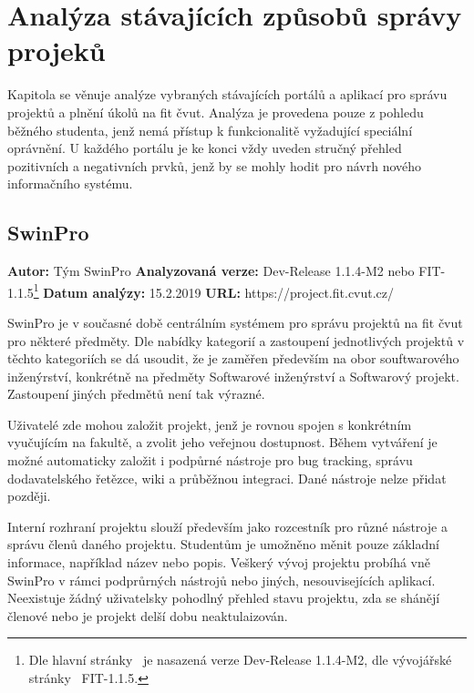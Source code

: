 \chapter{Analýza stávajících způsobů správy projeků}

Kapitola se věnuje analýze vybraných stávajících portálů a aplikací pro správu projektů a plnění úkolů na \gls{fit} \gls{čvut}. Analýza je provedena pouze z pohledu běžného studenta, jenž nemá přístup k funkcionalitě vyžadující speciální oprávnění. U každého portálu je ke konci vždy uveden stručný přehled pozitivních a negativních prvků, jenž by se mohly hodit pro návrh nového informačního systému.




\section{SwinPro}

\textbf{Autor:} Tým SwinPro\newline
\textbf{Analyzovaná verze:} Dev-Release 1.1.4-M2 nebo FIT-1.1.5\footnote{Dle hlavní stránky~\cite{swinproHome} je nasazená verze Dev-Release 1.1.4-M2, dle vývojářské stránky~\cite{swinproDevpage} FIT-1.1.5.}\newline
\textbf{Datum analýzy:} 15.2.2019\newline
\textbf{URL:} https://project.fit.cvut.cz/

SwinPro je v současné době centrálním systémem pro správu projektů na \gls{fit} \gls{čvut} pro některé předměty. Dle nabídky kategorií a zastoupení jednotlivých projektů v těchto kategoriích se dá usoudit, že je zaměřen především na obor souftwarového inženýrství, konkrétně na předměty Softwarové inženýrství a Softwarový projekt. Zastoupení jiných předmětů není tak výrazné.

Uživatelé zde mohou založit projekt, jenž je rovnou spojen s konkrétním vyučujícím na fakultě, a zvolit jeho veřejnou dostupnost. Během vytváření je možné automaticky založit i podpůrné nástroje pro bug tracking, správu dodavatelského řetězce, wiki a průběžnou integraci. Dané nástroje nelze přidat později.

Interní rozhraní projektu slouží především jako rozcestník pro různé nástroje a správu členů daného projektu. Studentům je umožněno měnit pouze základní informace, například název nebo popis. Veškerý vývoj projektu probíhá vně SwinPro v rámci podprůrných nástrojů nebo jiných, nesouvisejících aplikací. Neexistuje žádný uživatelsky pohodlný přehled stavu projektu, zda se shánějí členové nebo je projekt delší dobu neaktulaizován.

